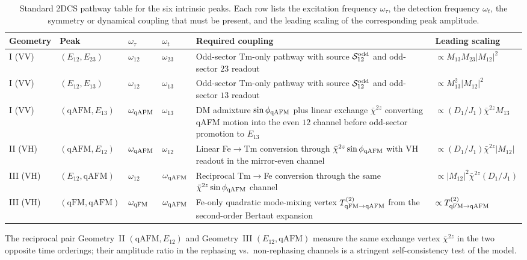\documentclass[reprint,amsmath,amssymb,aps,prb,longbibliography]{revtex4-2}
\begin{document}
\begin{table}[t]
\caption{Standard 2DCS pathway table for the six intrinsic peaks. Each
row lists the excitation frequency $\omega_\tau$, the detection
frequency $\omega_t$, the symmetry or dynamical coupling that must be
present, and the leading scaling of the corresponding peak amplitude.}
\label{tab:peaks}
\begin{ruledtabular}
\begin{tabular}{l|l|l|l|p{}|l}
Geometry & Peak & $\omega_\tau$ & $\omega_t$ & Required coupling & Leading scaling \\
\hline
I (VV) & $(E_{12},E_{23})$ & $\omega_{12}$ & $\omega_{23}$ & Odd-sector Tm-only pathway with source $\mathcal S_{12}^{\rm odd}$ and odd-sector $23$ readout & $\propto M_{13}M_{23}|M_{12}|^2$ \\
I (VV) & $(E_{12},E_{13})$ & $\omega_{12}$ & $\omega_{13}$ & Odd-sector Tm-only pathway with source $\mathcal S_{12}^{\rm odd}$ and odd-sector $13$ readout & $\propto M_{13}^2|M_{12}|^2$ \\
I (VV) & $(\mathrm{qAFM},E_{13})$ & $\omega_{\rm qAFM}$ & $\omega_{13}$ & DM admixture $\sin\phi_{\rm qAFM}$ plus linear exchange $\bar\chi^{2z}$ converting qAFM motion into the even $12$ channel before odd-sector promotion to $E_{13}$ & $\propto (D_1/J_1)\bar\chi^{2z} M_{13}$ \\
\hline
II (VH) & $(\mathrm{qAFM},E_{12})$ & $\omega_{\rm qAFM}$ & $\omega_{12}$ & Linear Fe$\to$Tm conversion through $\bar\chi^{2z}\sin\phi_{\rm qAFM}$ with VH readout in the mirror-even channel & $\propto (D_1/J_1)\bar\chi^{2z}|M_{12}|$ \\
\hline
III (VH) & $(E_{12},\mathrm{qAFM})$ & $\omega_{12}$ & $\omega_{\rm qAFM}$ & Reciprocal Tm$\to$Fe conversion through the same $\bar\chi^{2z}\sin\phi_{\rm qAFM}$ channel & $\propto |M_{12}|^2\bar\chi^{2z}(D_1/J_1)$ \\
III (VH) & $(\mathrm{qFM},\mathrm{qAFM})$ & $\omega_{\rm qFM}$ & $\omega_{\rm qAFM}$ & Fe-only quadratic mode-mixing vertex $T^{(2)}_{\rm qFM\to qAFM}$ from the second-order Bertaut expansion & $\propto T^{(2)}_{\rm qFM\to qAFM}$ \\
\end{tabular}
\end{ruledtabular}
\end{table}

The reciprocal pair Geometry~II $(\mathrm{qAFM},E_{12})$ and
Geometry~III $(E_{12},\mathrm{qAFM})$ measure the same exchange vertex
$\bar\chi^{2z}$ in the two opposite time orderings; their amplitude ratio
in the rephasing vs.\ non-rephasing channels is a stringent self-consistency
test of the model.
\end{document}
